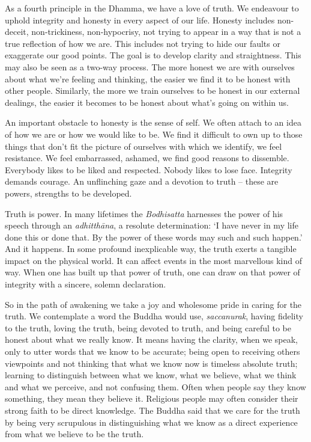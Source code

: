 As a fourth principle in the Dhamma, we have a love of truth. We
endeavour to uphold integrity and honesty in every aspect of our life.
Honesty includes non-deceit, non-trickiness, non-hypocrisy, not trying
to appear in a way that is not a true reflection of how we are. This
includes not trying to hide our faults or exaggerate our good points.
The goal is to develop clarity and straightness. This may also be seen
as a two-way process. The more honest we are with ourselves about what
we're feeling and thinking, the easier we find it to be honest with
other people. Similarly, the more we train ourselves to be honest in our
external dealings, the easier it becomes to be honest about what's going
on within us.

An important obstacle to honesty is the sense of self. We often attach
to an idea of how we are or how we would like to be. We find it
difficult to own up to those things that don't fit the picture of
ourselves with which we identify, we feel resistance. We feel
embarrassed, ashamed, we find good reasons to dissemble. Everybody likes
to be liked and respected. Nobody likes to lose face. Integrity demands
courage. An unflinching gaze and a devotion to truth -- these are
powers, strengths to be developed.

Truth is power. In many lifetimes the \emph{Bodhisatta} harnesses the
power of his speech through an \emph{adhitthāna}, a resolute
determination: `I have never in my life done this or done that. By the
power of these words may such and such happen.' And it happens. In some
profound inexplicable way, the truth exerts a tangible impact on the
physical world. It can affect events in the most marvellous kind of way.
When one has built up that power of truth, one can draw on that power of
integrity with a sincere, solemn declaration.

So in the path of awakening we take a joy and wholesome pride in caring
for the truth. We contemplate a word the Buddha would use,
\emph{saccanurak}, having fidelity to the truth, loving the truth, being
devoted to truth, and being careful to be honest about what we really
know. It means having the clarity, when we speak, only to utter words
that we know to be accurate; being open to receiving others viewpoints
and not thinking that what we know now is timeless absolute truth;
learning to distinguish between what we know, what we believe, what we
think and what we perceive, and not confusing them. Often when people
say they know something, they mean they believe it. Religious people may
often consider their strong faith to be direct knowledge. The Buddha
said that we care for the truth by being very scrupulous in
distinguishing what we know as a direct experience from what we believe
to be the truth.

